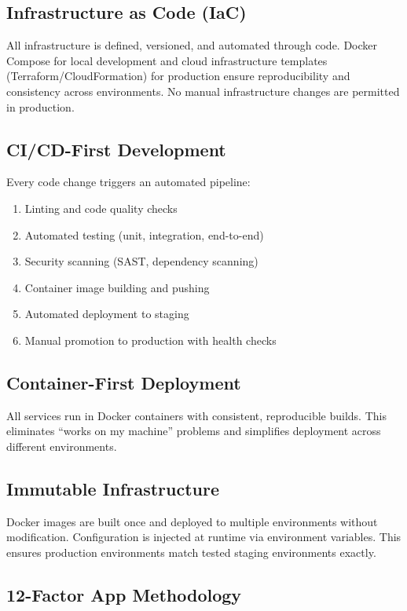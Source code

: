 \documentclass{report}
\begin{document}
\subsection{Infrastructure as Code (IaC)}

All infrastructure is defined, versioned, and automated through code. Docker Compose for local development and cloud infrastructure templates (Terraform/CloudFormation) for production ensure reproducibility and consistency across environments. No manual infrastructure changes are permitted in production.

\subsection{CI/CD-First Development}

Every code change triggers an automated pipeline:
\begin{enumerate}
  \item Linting and code quality checks
  \item Automated testing (unit, integration, end-to-end)
  \item Security scanning (SAST, dependency scanning)
  \item Container image building and pushing
  \item Automated deployment to staging
  \item Manual promotion to production with health checks
\end{enumerate}

\subsection{Container-First Deployment}

All services run in Docker containers with consistent, reproducible builds. This eliminates ``works on my machine'' problems and simplifies deployment across different environments.

\subsection{Immutable Infrastructure}

Docker images are built once and deployed to multiple environments without modification. Configuration is injected at runtime via environment variables. This ensures production environments match tested staging environments exactly.

\subsection{12-Factor App Methodology}
\end{document}
